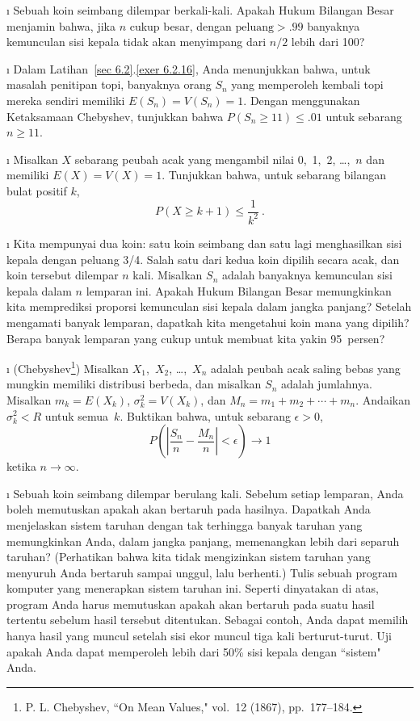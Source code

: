 \begin{LJSItem}
\i\label{exer 8.1.104} Sebuah koin seimbang dilempar berkali-kali.  Apakah Hukum Bilangan
Besar menjamin bahwa, jika $n$ cukup besar, dengan $\mbox {peluang} >
.99$ banyaknya kemunculan sisi kepala tidak akan menyimpang dari $n/2$ lebih dari
100?

\i\label{exer 8.1.105} Dalam Latihan~\ref{sec 6.2}.\ref{exer 6.2.16}, Anda menunjukkan bahwa, untuk
masalah penitipan topi, banyaknya orang $S_n$ yang memperoleh kembali topi mereka sendiri memiliki $E(S_n) =
V(S_n) = 1$.  Dengan menggunakan Ketaksamaan Chebyshev, tunjukkan bahwa $P(S_n \geq 11) \leq .01$
untuk sebarang $n \geq 11$.

\i\label{exer 8.1.106} Misalkan $X$ sebarang peubah acak yang mengambil nilai 0,~1,~2,
\dots,~$n$ dan memiliki $E(X) = V(X) = 1$.  Tunjukkan bahwa, untuk sebarang bilangan bulat positif $k$,
$$
P(X \geq k + 1) \leq \frac 1{k^2}\ .
$$

\i\label{exer 8.1.107} Kita mempunyai dua koin: satu koin seimbang dan satu lagi menghasilkan
sisi kepala dengan peluang 3/4.  Salah satu dari kedua koin dipilih secara acak,
dan koin tersebut dilempar $n$ kali.  Misalkan $S_n$ adalah banyaknya kemunculan sisi kepala
dalam $n$ lemparan ini.  Apakah Hukum Bilangan Besar memungkinkan kita memprediksi
proporsi kemunculan sisi kepala dalam jangka panjang?  Setelah mengamati
banyak lemparan, dapatkah kita mengetahui koin mana yang dipilih?  Berapa banyak lemparan
yang cukup untuk membuat kita yakin 95~persen?

\i\label{exer 8.1.13} (Chebyshev\footnote{P. L. Chebyshev, ``On Mean
Values,"  vol.~12 (1867), pp.~177--184.})  Misalkan
$X_1$,~$X_2$, \dots,~$X_n$ adalah peubah acak saling bebas yang mungkin memiliki
distribusi berbeda, dan misalkan $S_n$ adalah jumlahnya.  Misalkan $m_k = E(X_k)$,
$\sigma_k^2 = V(X_k)$, dan $M_n = m_1 + m_2 +\cdots+ m_n$.  Andaikan
$\sigma_k^2 < R$ untuk semua~$k$.  Buktikan bahwa, untuk sebarang $\epsilon > 0$,
$$
P\left( \left| \frac {S_n}n - \frac {M_n}n \right| < \epsilon \right) \to 1
$$
ketika $n \rightarrow \infty$.

\i\label{exer 8.1.108}  Sebuah koin seimbang dilempar berulang kali.  Sebelum setiap lemparan, Anda boleh
memutuskan apakah akan bertaruh pada hasilnya.  Dapatkah Anda menjelaskan sistem taruhan dengan
tak terhingga banyak taruhan yang memungkinkan Anda, dalam jangka panjang, memenangkan lebih dari separuh taruhan? 
(Perhatikan bahwa kita tidak mengizinkan sistem taruhan yang menyuruh Anda bertaruh sampai unggul, lalu
berhenti.) Tulis sebuah program komputer yang menerapkan sistem taruhan ini.  Seperti dinyatakan di atas,
program Anda harus memutuskan apakah akan bertaruh pada suatu hasil tertentu sebelum hasil tersebut ditentukan.
Sebagai contoh, Anda dapat memilih hanya hasil yang muncul setelah
sisi ekor muncul tiga kali berturut-turut.  Uji apakah Anda dapat memperoleh lebih dari 50\% sisi kepala
dengan ``sistem" Anda.


\end{LJSItem}
